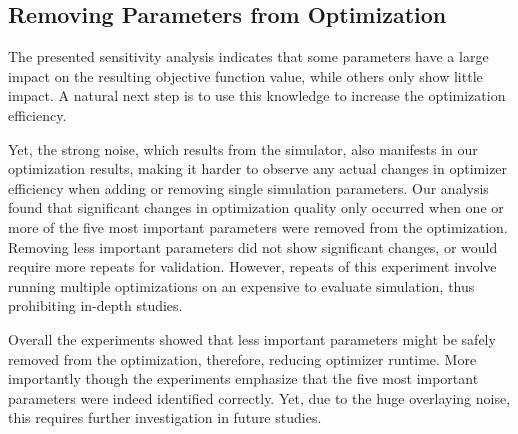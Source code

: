 \documentclass[conference]{IEEEtran}
\begin{document}
\subsection{Removing Parameters from Optimization}\label{sec:removing}
The presented sensitivity analysis indicates that some parameters have a large impact on the resulting objective function value, while others only show little impact. 
A natural next step is to use this knowledge to increase the optimization efficiency. 

Yet, the strong noise, which results from the simulator, also manifests in our optimization results, making it harder to observe any actual changes in optimizer efficiency when adding or removing single simulation parameters.
Our analysis found that significant changes in optimization quality only occurred when one or more of the five most important parameters were removed from the optimization. 
Removing less important parameters did not show significant changes, or would require more repeats for validation. 
However, repeats of this experiment involve running multiple optimizations on an expensive to evaluate simulation, thus prohibiting in-depth studies.  

Overall the experiments showed that less important parameters might be safely removed from the optimization, therefore, reducing optimizer runtime.
More importantly though the experiments emphasize that the five most important parameters were indeed identified correctly.
Yet, due to the huge overlaying noise, this requires further investigation in future studies.

\end{document}
